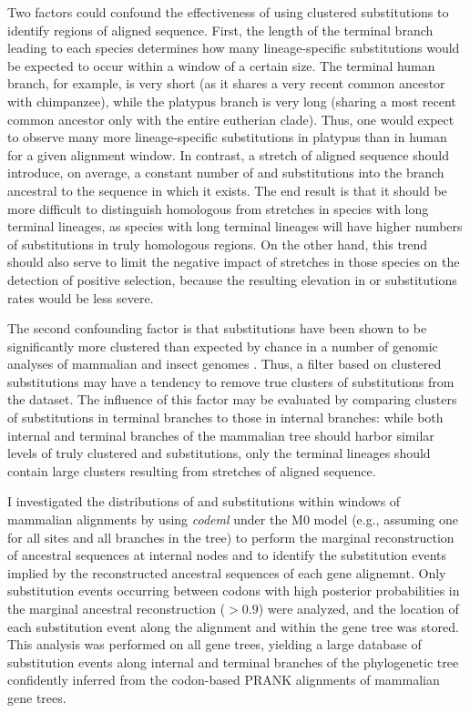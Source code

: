 Two factors could confound the effectiveness of using clustered
substitutions to identify regions of \nhom aligned sequence. First,
the length of the terminal branch leading to each species determines
how many lineage-specific substitutions would be expected to occur
within a window of a certain size. The terminal human branch, for
example, is very short (as it shares a very recent common ancestor
with chimpanzee), while the platypus branch is very long (sharing a
most recent common ancestor only with the entire eutherian
clade). Thus, one would expect to observe many more lineage-specific
substitutions in platypus than in human for a given alignment
window. In contrast, a stretch of \nhom aligned sequence should
introduce, on average, a constant number of \nsyn and \syn
substitutions into the branch ancestral to the sequence in which it
exists. The end result is that it should be more difficult to
distinguish homologous from \nhom stretches in species with long
terminal lineages, as species with long terminal lineages will have
higher numbers of substitutions in truly homologous regions. On the
other hand, this trend should also serve to limit the negative impact
of \nhom stretches in those species on the detection of positive
selection, because the resulting elevation in \nsyn or \syn
substitutions rates would be less severe.

The second confounding factor is that \nsyn substitutions have been
shown to be significantly more clustered than expected by chance in a
number of genomic analyses of mammalian and insect genomes
\citep{Callahan2011,Bazykin2004,Wang2007}. Thus, a filter based on
clustered \nsyn substitutions may have a tendency to remove true
clusters of \nsyn substitutions from the dataset. The influence of
this factor may be evaluated by comparing clusters of substitutions in
terminal branches to those in internal branches: while both internal
and terminal branches of the mammalian tree should harbor similar
levels of truly clustered \nsyn and \syn substitutions, only the
terminal lineages should contain large clusters resulting from
stretches of aligned \nhom sequence.

I investigated the distributions of \nsyn and \syn substitutions
within windows of mammalian alignments by using \emph{codeml}
\citep{Yang2007PAML} under the M0 model (e.g., assuming one \omg for all
sites and all branches in the tree) to perform the marginal
reconstruction of ancestral sequences at internal nodes
\citep{Yang1995} and to identify the substitution events implied by
the reconstructed ancestral sequences of each gene alignemnt. Only
substitution events occurring between codons with high posterior
probabilities in the marginal ancestral reconstruction ($>0.9$) were
analyzed, and the location of each substitution event along the
alignment and within the gene tree was stored. This analysis was
performed on all gene trees, yielding a large database of substitution
events along internal and terminal branches of the phylogenetic tree
confidently inferred from the codon-based PRANK alignments of
mammalian gene trees.

